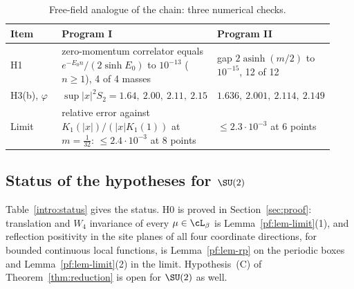 \begin{table}[ht]
\centering
\small
\begin{tabular}{@{}p{0.17\linewidth}p{0.47\linewidth}p{0.29\linewidth}@{}}
\toprule
Item & Program I & Program II \\
\midrule
H1 & zero-momentum correlator equals $e^{-E_0n}/(2\sinh E_0)$ to $10^{-13}$ ($n\ge1$), 4 of 4 masses & gap $2\operatorname{asinh}(m/2)$ to $10^{-15}$, 12 of 12 \\
H3(b), $\varphi$ & $\sup|x|^2S_2=1.64,\ 2.00,\ 2.11,\ 2.15$ & $1.636,\ 2.001,\ 2.114,\ 2.149$ \\
Limit & relative error against $K_1(|x|)/(|x|K_1(1))$ at $m=\tfrac1{32}$: $\le2.4\cdot10^{-3}$ at 8 points & $\le2.3\cdot10^{-3}$ at 6 points \\
\bottomrule
\end{tabular}
\caption{Free-field analogue of the chain: three numerical checks.}\label{red:freetab}
\end{table}

\subsection{Status of the hypotheses for \texorpdfstring{$\SU(2)$}{SU(2)}}\label{red:statussec}

Table~\ref{intro:status} gives the status. H0 is proved in Section~\ref{sec:proof}: translation and $W_4$ invariance of every $\mu\in\cL_\beta$ is Lemma~\ref{pf:lem-limit}(1), and reflection positivity in the site planes of all four coordinate directions, for bounded continuous local functions, is Lemma~\ref{pf:lem-rp} on the periodic boxes and Lemma~\ref{pf:lem-limit}(2) in the limit. Hypothesis~(C) of Theorem~\ref{thm:reduction} is open for $\SU(2)$ as well.
